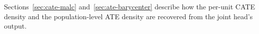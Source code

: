 \documentclass[11pt]{article}
\begin{document}


Sections~\ref{sec:cate-malc} and~\ref{sec:ate-barycenter} describe how the per-unit CATE density and the population-level ATE density are recovered from the joint head's output.
\end{document}
